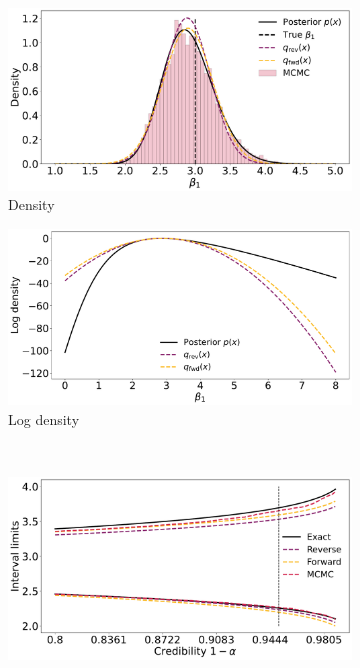 \begin{figure}[ht]
    \begin{subfigure}{0.475\linewidth}
    \centering
    \includegraphics[width=\linewidth]{fig/logreg_q.pdf}
    \caption{Density}
    \label{fig:logreg_p}
    \end{subfigure}%
    \begin{subfigure}{0.475\linewidth}
        \centering
        \includegraphics[width=\linewidth]{fig/logreg_logq.pdf}
        \caption{Log density}
        \label{fig:logreg_lp}
        \end{subfigure}\\[1ex]
    \begin{subfigure}{\linewidth}
    \centering
    \includegraphics[width=0.8\linewidth]{fig/logreg_cilims.pdf}

\end{subfigure}
\end{figure}
